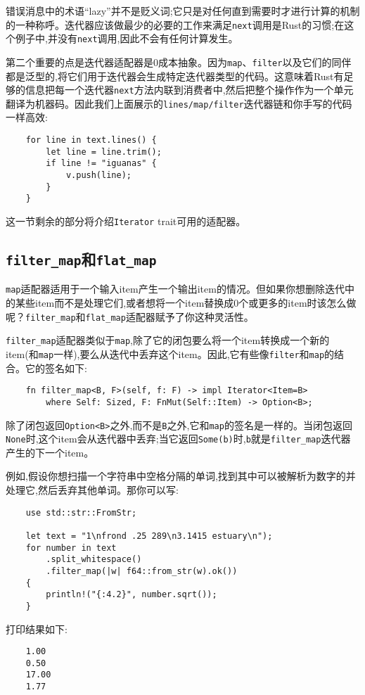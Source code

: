 错误消息中的术语“lazy”并不是贬义词;它只是对任何直到需要时才进行计算的机制的一种称呼。迭代器应该做最少的必要的工作来满足\texttt{next}调用是Rust的习惯;在这个例子中,并没有\texttt{next}调用,因此不会有任何计算发生。

第二个重要的点是迭代器适配器是0成本抽象。因为\texttt{map}、\texttt{filter}以及它们的同伴都是泛型的,将它们用于迭代器会生成特定迭代器类型的代码。这意味着Rust有足够的信息把每一个迭代器\texttt{next}方法内联到消费者中,然后把整个操作作为一个单元翻译为机器码。因此我们上面展示的\texttt{lines/map/filter}迭代器链和你手写的代码一样高效:
\begin{verbatim}
    for line in text.lines() {
        let line = line.trim();
        if line != "iguanas" {
            v.push(line);
        }
    }
\end{verbatim}

这一节剩余的部分将介绍\texttt{Iterator} trait可用的适配器。

\subsection{\texttt{filter\_map}和\texttt{flat\_map}}
\texttt{map}适配器适用于一个输入item产生一个输出item的情况。但如果你想删除迭代中的某些item而不是处理它们,或者想将一个item替换成0个或更多的item时该怎么做呢？\texttt{filter\_map}和\texttt{flat\_map}适配器赋予了你这种灵活性。

\texttt{filter\_map}适配器类似于\texttt{map},除了它的闭包要么将一个item转换成一个新的item(和\texttt{map}一样),要么从迭代中丢弃这个item。因此,它有些像\texttt{filter}和\texttt{map}的结合。它的签名如下:
\begin{verbatim}
    fn filter_map<B, F>(self, f: F) -> impl Iterator<Item=B>
        where Self: Sized, F: FnMut(Self::Item) -> Option<B>;
\end{verbatim}

除了闭包返回\texttt{Option<B>}之外,而不是\texttt{B}之外,它和\texttt{map}的签名是一样的。当闭包返回\texttt{None}时,这个item会从迭代器中丢弃;当它返回\texttt{Some(b)}时,\texttt{b}就是\texttt{filter\_map}迭代器产生的下一个item。

例如,假设你想扫描一个字符串中空格分隔的单词,找到其中可以被解析为数字的并处理它,然后丢弃其他单词。那你可以写:
\begin{verbatim}
    use std::str::FromStr;

    let text = "1\nfrond .25 289\n3.1415 estuary\n");
    for number in text
        .split_whitespace()
        .filter_map(|w| f64::from_str(w).ok())
    {
        println!("{:4.2}", number.sqrt());
    }
\end{verbatim}
打印结果如下:
\begin{verbatim}
    1.00
    0.50
    17.00
    1.77
\end{verbatim}

